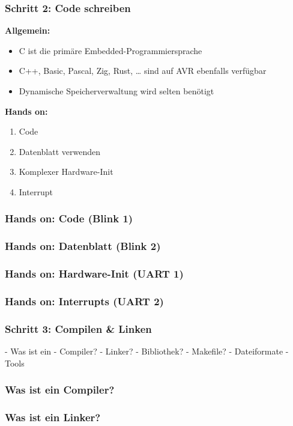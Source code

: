 \documentclass{beamer}
\begin{document}
\begin{frame}
\frametitle{Schritt 2: Code schreiben}

\textbf{Allgemein:}
\begin{itemize}
\item C ist die primäre Embedded-Programmiersprache
\item C++, Basic, Pascal, Zig, Rust, … sind auf AVR ebenfalls verfügbar
\item Dynamische Speicherverwaltung wird selten benötigt
\end{itemize}

\textbf{Hands on:}
\begin{enumerate}
\item Code
\item Datenblatt verwenden
\item Komplexer Hardware-Init
\item Interrupt
\end{enumerate}
\end{frame}

\begin{frame}
\frametitle{Hands on: Code (Blink 1)}

\end{frame}

\begin{frame}
\frametitle{Hands on: Datenblatt (Blink 2)}

\end{frame}

\begin{frame}
\frametitle{Hands on: Hardware-Init (UART 1)}

\end{frame}

\begin{frame}
\frametitle{Hands on: Interrupts (UART 2)}

\end{frame}

\begin{frame}
\frametitle{Schritt 3: Compilen \& Linken}
- Was ist ein
    - Compiler?
    - Linker?
    - Bibliothek?
    - Makefile?
- Dateiformate
- Tools
\end{frame}

\begin{frame}
\frametitle{Was ist ein Compiler?}
\end{frame}

\begin{frame}
\frametitle{Was ist ein Linker?}
\end{frame}
\end{document}
